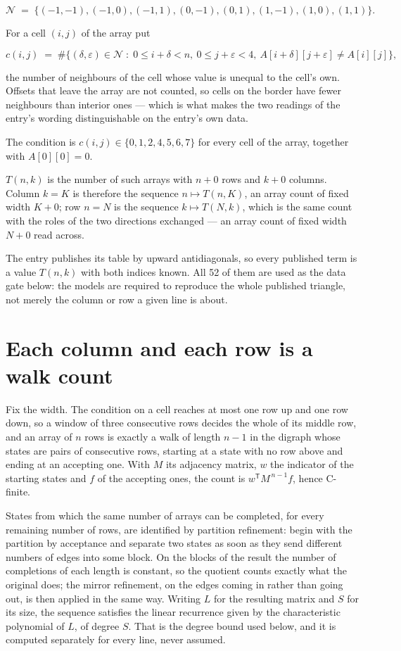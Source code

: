 \documentclass[11pt]{article}
\theoremstyle{definition}
\begin{document}
\[\mathcal{N} \;=\; \{(-1,-1), (-1,0), (-1,1), (0,-1), (0,1), (1,-1), (1,0), (1,1)\}.\]

For a cell $(i,j)$ of the array put

\[c(i,j) \;=\; \#\bigl\{(\delta,\varepsilon)\in\mathcal{N} \;:\; 0\le i+\delta<n,\ 0\le j+\varepsilon<4,\ A[i+\delta][j+\varepsilon] \neq A[i][j]\bigr\},\]

the number of neighbours of the cell whose value is unequal to the cell's own. Offsets that leave the array are not counted, so cells on the border have fewer neighbours than interior ones --- which is what makes the two readings of the entry's wording distinguishable on the entry's own data.

The condition is $c(i,j) \in \{0, 1, 2, 4, 5, 6, 7\}$ for every cell of the array, together with $A[0][0]=0$.

$T(n,k)$ is the number of such arrays with $n + 0$ rows and $k + 0$ columns. Column $k = K$ is therefore the sequence $n \mapsto T(n,K)$, an array count of fixed width $K + 0$; row $n = N$ is the sequence $k \mapsto T(N,k)$, which is the same count with the roles of the two directions exchanged --- an array count of fixed width $N + 0$ read across.

The entry publishes its table by upward antidiagonals, so every published term is a value $T(n,k)$ with both indices known. All 52 of them are used as the data gate below: the models are required to reproduce the whole published triangle, not merely the column or row a given line is about.

\section{Each column and each row is a walk count}

Fix the width. The condition on a cell reaches at most one row up and one row down, so a window of three consecutive rows decides the whole of its middle row, and an array of $n$ rows is exactly a walk of length $n-1$ in the digraph whose states are pairs of consecutive rows, starting at a state with no row above and ending at an accepting one. With $M$ its adjacency matrix, $w$ the indicator of the starting states and $f$ of the accepting ones, the count is $w^{\mathsf T}M^{\,n-1}f$, hence C-finite.

States from which the same number of arrays can be completed, for every remaining number of rows, are identified by partition refinement: begin with the partition by acceptance and separate two states as soon as they send different numbers of edges into some block. On the blocks of the result the number of completions of each length is constant, so the quotient counts exactly what the original does; the mirror refinement, on the edges coming in rather than going out, is then applied in the same way. Writing $L$ for the resulting matrix and $S$ for its size, the sequence satisfies the linear recurrence given by the characteristic polynomial of $L$, of degree $S$. That is the degree bound used below, and it is computed separately for every line, never assumed.
\end{document}
